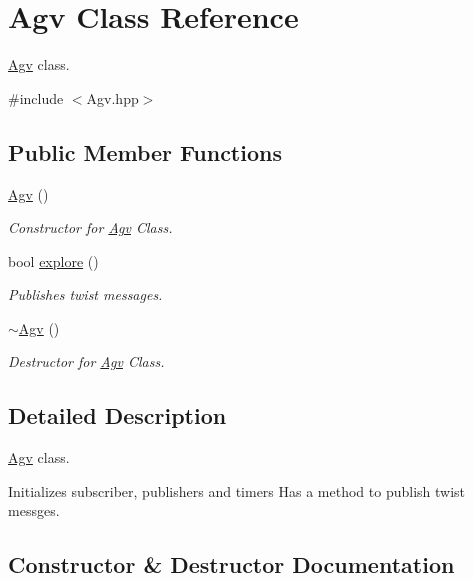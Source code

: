 \hypertarget{classAgv}{}\section{Agv Class Reference}
\label{classAgv}


\hyperlink{classAgv}{Agv} class.  




{\ttfamily \#include $<$Agv.\+hpp$>$}

\subsection*{Public Member Functions}
\begin{DoxyCompactItemize}
\item 
\hyperlink{classAgv_a43036bf3c176af41f9b4da2415802c3a}{Agv} ()
\begin{DoxyCompactList}\small\item\em Constructor for \hyperlink{classAgv}{Agv} Class. \end{DoxyCompactList}\item 
bool \hyperlink{classAgv_afe73463f67d447886bf729e967363124}{explore} ()
\begin{DoxyCompactList}\small\item\em Publishes twist messages. \end{DoxyCompactList}\item 
\hyperlink{classAgv_a3de534d67ab8587b966e65be45040747}{$\sim$\+Agv} ()\hypertarget{classAgv_a3de534d67ab8587b966e65be45040747}{}\label{classAgv_a3de534d67ab8587b966e65be45040747}

\begin{DoxyCompactList}\small\item\em Destructor for \hyperlink{classAgv}{Agv} Class. \end{DoxyCompactList}\end{DoxyCompactItemize}


\subsection{Detailed Description}
\hyperlink{classAgv}{Agv} class. 

Initializes subscriber, publishers and timers Has a method to publish twist messges. 

\subsection{Constructor \& Destructor Documentation}
